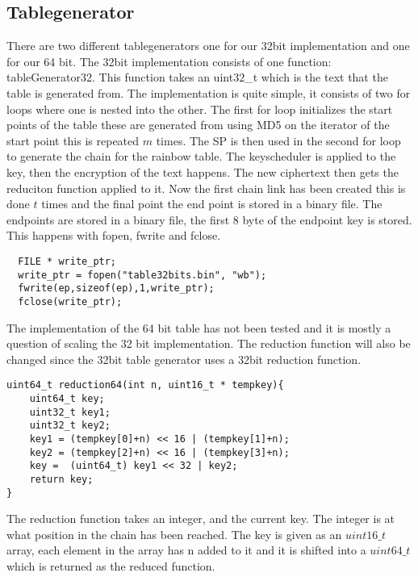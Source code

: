 \subsection{Tablegenerator}
There are two different tablegenerators one for our 32bit implementation and one for our 64 bit.
The 32bit implementation consists of one function: tableGenerator32. This function takes an uint32\_t which is the text that the table is generated from. The implementation is quite simple, it consists of two for loops where one is nested into the other. The first for loop initializes the start points of the table these are generated from using MD5 on the iterator of the start point this is repeated $m$ times.
The SP is then used in the second for loop to generate the chain for the rainbow table.
The keyscheduler is applied to the key, then the encryption of the text happens. The new ciphertext then gets the reduciton function applied to it. Now the first chain link has been created this is done $t$ times and the final point the end point is stored in a binary file.
The endpoints are stored in a binary file, the first 8 byte of the endpoint key is stored. This happens with fopen, fwrite and fclose.
\lstset{language=C}
\begin{lstlisting}
  FILE * write_ptr;
  write_ptr = fopen("table32bits.bin", "wb");
  fwrite(ep,sizeof(ep),1,write_ptr);
  fclose(write_ptr);
\end{lstlisting}
The implementation of the 64 bit table has not been tested and it is mostly a question of scaling the 32 bit implementation. The reduction function will also be changed since the 32bit table generator uses a 32bit reduction function.
\begin{lstlisting}
uint64_t reduction64(int n, uint16_t * tempkey){
    uint64_t key;
    uint32_t key1;
    uint32_t key2;
    key1 = (tempkey[0]+n) << 16 | (tempkey[1]+n);
    key2 = (tempkey[2]+n) << 16 | (tempkey[3]+n);
    key =  (uint64_t) key1 << 32 | key2;
    return key;
}
\end{lstlisting}

The reduction function takes an integer, and the current key. The integer is at what position in the chain has been reached. The key is given as an $uint16\_t$ array, each element in the array has n added to it and it is shifted into a $uint64\_t$ which is returned as the reduced function.

